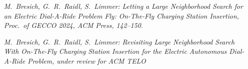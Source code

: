 \documentclass[aspectratio=1610]{beamer}
\newcommand{\important}[1]{{\color{green!60!black}#1}}
\let\oldfootnotesize\footnotesize
\renewcommand*{\footnotesize}{\oldfootnotesize\fontsize{6}{4}\selectfont}
\renewcommand{\footnotesize}{\scriptsize}
\begin{document}
\begin{frame}
	\begin{center}
		{\LARGE\bf{}}
	\end{center}

	\bigskip
	\emph{M.~Bresich, G.~R.~Raidl, S.~Limmer: Letting a Large Neighborhood Search for an Electric Dial-A-Ride Problem Fly: On-The-Fly Charging Station Insertion, Proc.\ of GECCO 2024, ACM Press, 142--150.}

	\bigskip
	\emph{M.~Bresich, G.~R.~Raidl, S.~Limmer: Revisiting Large Neighborhood Search With On-The-Fly Charging Station Insertion for the Electric Autonomous Dial-A-Ride Problem, under review for ACM TELO}
\end{frame}

	
	

\end{document}
